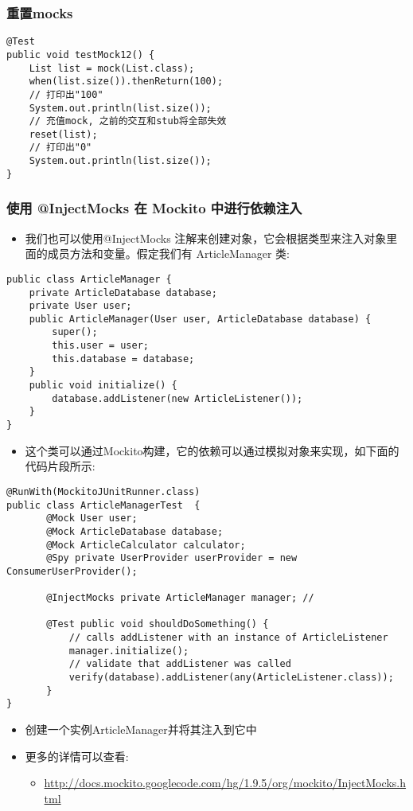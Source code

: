 \documentclass[9pt, b5paper]{article}
\begin{document}
\subsubsection{重置mocks}
\label{sec-1-1-9}
\begin{verbatim}
@Test
public void testMock12() {
    List list = mock(List.class);
    when(list.size()).thenReturn(100);
    // 打印出"100"
    System.out.println(list.size());
    // 充值mock, 之前的交互和stub将全部失效
    reset(list);
    // 打印出"0"
    System.out.println(list.size());
}
\end{verbatim}
\subsubsection{使用 @InjectMocks 在 Mockito 中进行依赖注入}
\label{sec-1-1-10}
\begin{itemize}
\item 我们也可以使用@InjectMocks 注解来创建对象，它会根据类型来注入对象里面的成员方法和变量。假定我们有 ArticleManager 类:
\end{itemize}
\begin{verbatim}
public class ArticleManager {
    private ArticleDatabase database;
    private User user;
    public ArticleManager(User user, ArticleDatabase database) {
        super();
        this.user = user;
        this.database = database;
    }
    public void initialize() {
        database.addListener(new ArticleListener());
    }
}
\end{verbatim}
\begin{itemize}
\item 这个类可以通过Mockito构建，它的依赖可以通过模拟对象来实现，如下面的代码片段所示:
\end{itemize}
\begin{verbatim}
@RunWith(MockitoJUnitRunner.class)
public class ArticleManagerTest  {
       @Mock User user;
       @Mock ArticleDatabase database;
       @Mock ArticleCalculator calculator;
       @Spy private UserProvider userProvider = new ConsumerUserProvider();

       @InjectMocks private ArticleManager manager; // 

       @Test public void shouldDoSomething() {
           // calls addListener with an instance of ArticleListener
           manager.initialize();
           // validate that addListener was called
           verify(database).addListener(any(ArticleListener.class));
       }
}
\end{verbatim}
\begin{itemize}
\item 创建一个实例ArticleManager并将其注入到它中
\item 更多的详情可以查看:
\begin{itemize}
\item \url{http://docs.mockito.googlecode.com/hg/1.9.5/org/mockito/InjectMocks.html}
\end{itemize}
\end{itemize}
\end{document}
